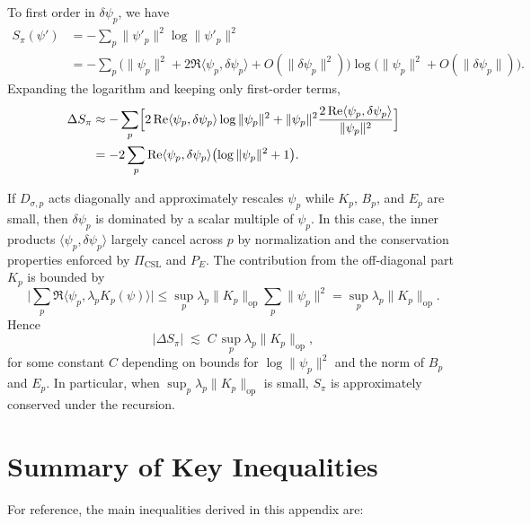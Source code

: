 \documentclass[11pt]{article}
\begin{document}
To first order in $\delta \psi_p$, we have
\begin{align*}
  S_\pi(\psi')
  &= - \sum_p \|\psi'_p\|^2 \log \|\psi'_p\|^2 \\
  &= - \sum_p \bigl(\|\psi_p\|^2 + 2 \Re \langle \psi_p, \delta \psi_p \rangle + O(\|\delta \psi_p\|^2)\bigr)
                    \log\bigl(\|\psi_p\|^2 + O(\|\delta \psi_p\|)\bigr).
\end{align*}
Expanding the logarithm and keeping only first-order terms,
\begin{align*}
  \Delta S_\pi
  &\approx
  - \sum_p
    \Bigl[
      2 \Re \langle \psi_p, \delta \psi_p \rangle \log \|\psi_p\|^2
      + \|\psi_p\|^2 \frac{2 \Re \langle \psi_p, \delta \psi_p \rangle}{\|\psi_p\|^2}
    \Bigr] \\
  &= - 2 \sum_p \Re \langle \psi_p, \delta \psi_p \rangle
      \bigl( \log \|\psi_p\|^2 + 1 \bigr).
\end{align*}

If $D_{\sigma,p}$ acts diagonally and approximately rescales $\psi_p$ while $K_p$, $B_p$, and $E_p$ are small, then $\delta \psi_p$ is dominated by a scalar multiple of $\psi_p$.
In this case, the inner products $\langle \psi_p, \delta \psi_p \rangle$ largely cancel across $p$ by normalization and the conservation properties enforced by $\Pi_{\text{CSL}}$ and $P_E$.
The contribution from the off-diagonal part $K_p$ is bounded by
\[
  \biggl| \sum_p \Re \langle \psi_p, \lambda_p K_p(\psi) \rangle \biggr|
  \le \sup_p \lambda_p \|K_p\|_{\mathrm{op}} \sum_p \|\psi_p\|^2
  =  \sup_p \lambda_p \|K_p\|_{\mathrm{op}}.
\]
Hence
\begin{equation}
  |\Delta S_\pi|
  \;\lesssim\;
  C \, \sup_p \lambda_p \|K_p\|_{\mathrm{op}},
\end{equation}
for some constant $C$ depending on bounds for $\log \|\psi_p\|^2$ and the norm of $B_p$ and $E_p$.
In particular, when $\sup_p \lambda_p \|K_p\|_{\mathrm{op}}$ is small, $S_\pi$ is approximately conserved under the recursion.

\section{Summary of Key Inequalities}

For reference, the main inequalities derived in this appendix are:
\end{document}
